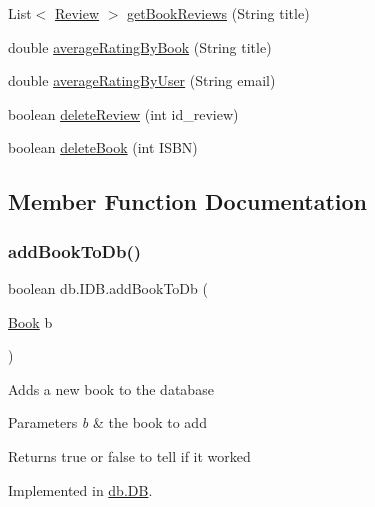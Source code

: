 \begin{DoxyCompactItemize}
\item 
List$<$ \hyperlink{classserver_1_1data_1_1_review}{Review} $>$ \hyperlink{interfacedb_1_1_i_d_b_a6b8fda48df77b542b8713bc4f035bccf}{get\+Book\+Reviews} (String title)
\item 
double \hyperlink{interfacedb_1_1_i_d_b_a4d23da2e383e7fe0638089fb2686b6c3}{average\+Rating\+By\+Book} (String title)
\item 
double \hyperlink{interfacedb_1_1_i_d_b_a5bb2209c976ab0a7f20606ed5df0e0cf}{average\+Rating\+By\+User} (String email)
\item 
boolean \hyperlink{interfacedb_1_1_i_d_b_a37810242fa48895f21f790ef6a367225}{delete\+Review} (int id\+\_\+review)
\item 
boolean \hyperlink{interfacedb_1_1_i_d_b_a8fa065455c75f33b9713b8d5058a0e30}{delete\+Book} (int I\+S\+BN)
\end{DoxyCompactItemize}


\subsection{Member Function Documentation}
\mbox{\label{interfacedb_1_1_i_d_b_a63904b26597f651ea6acbd03384e0afb}} 
\subsubsection{\texorpdfstring{add\+Book\+To\+Db()}{addBookToDb()}}
{\footnotesize\ttfamily boolean db.\+I\+D\+B.\+add\+Book\+To\+Db (\begin{DoxyParamCaption}\item[{\hyperlink{classserver_1_1data_1_1_book}{Book}}]{b }\end{DoxyParamCaption})}

Adds a new book to the database 
\begin{DoxyParams}{Parameters}
{\em b} & the book to add \\
\hline
\end{DoxyParams}
\begin{DoxyReturn}{Returns}
true or false to tell if it worked 
\end{DoxyReturn}


Implemented in \hyperlink{classdb_1_1_d_b_a705ed9c0ffae567ec3ac09fbd7138c6f}{db.\+DB}.

\mbox{\label{interfacedb_1_1_i_d_b_a00a453c6d4fc604615f5a173d86600fc}} 
